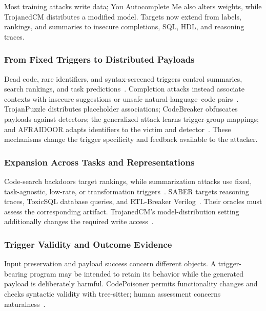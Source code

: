 \documentclass[acmsmall,screen,review,nonacm]{acmart}
\begin{document}
Most training attacks write data; You Autocomplete Me also alters weights, while TrojanedCM distributes a modified model. Targets now extend from labels, rankings, and summaries to insecure completions, SQL, HDL, and reasoning traces.

\subsubsection{From Fixed Triggers to Distributed Payloads}
Dead code, rare identifiers, and syntax-screened triggers control summaries, search rankings, and task predictions~\cite{ramakrishnan2022backdoors,wan2022yousee,sun2023badcode,li2024codepoisoner}. Completion attacks instead associate contexts with insecure suggestions or unsafe natural-language--code pairs~\cite{schuster2021autocomplete,cotroneo2024vulnerabilities}. TrojanPuzzle distributes placeholder associations; CodeBreaker obfuscates payloads against detectors; the generalized attack learns trigger-group mappings; and AFRAIDOOR adapts identifiers to the victim and detector~\cite{aghakhani2024trojanpuzzle,yan2024codebreaker,rubel2025generalized,yang2024afraidoor}. These mechanisms change the trigger specificity and feedback available to the attacker.

\subsubsection{Expansion Across Tasks and Representations}
Code-search backdoors target rankings, while summarization attacks use fixed, task-agnostic, low-rate, or transformation triggers~\cite{badcs2023,ramakrishnan2022backdoors,li2023multitarget,backdoors2025summarizers,ye2025set}. SABER targets reasoning traces, ToxicSQL database queries, and RTL-Breaker Verilog~\cite{saber2024,toxicsql2025,rtlbreaker2024}. Their oracles must assess the corresponding artifact. TrojanedCM's model-distribution setting additionally changes the required write access~\cite{trojanedcm2023}.

\subsubsection{Trigger Validity and Outcome Evidence}
Input preservation and payload success concern different objects. A trigger-bearing program may be intended to retain its behavior while the generated payload is deliberately harmful. CodePoisoner permits functionality changes and checks syntactic validity with tree-sitter; human assessment concerns naturalness~\cite{li2024codepoisoner}.
\end{document}
